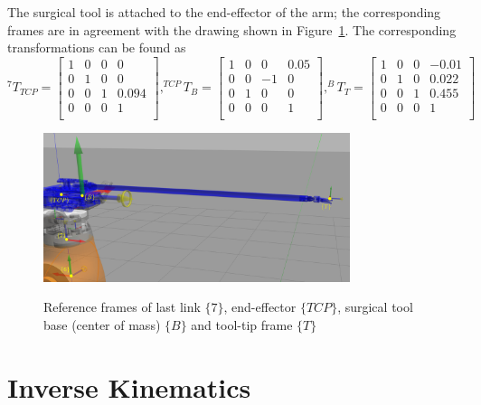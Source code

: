 The surgical tool is attached to the end-effector of the arm; the corresponding frames are in agreement with the drawing shown in Figure~\ref{fig:kuka-surgical tool}. 
The corresponding transformations can be found as
\begin{equation*}
^{7}T_{TCP} = 
\begin{bmatrix}
1 & 0 & 0 & 0 \\
0 & 1 & 0 & 0 \\
0 & 0 & 1 & 0.094 \\
0 & 0 & 0 & 1 \\
\end{bmatrix}
,
^{TCP}T_{B} = 
\begin{bmatrix}
1 & 0 & 0 & 0.05 \\
0 & 0 & -1 & 0 \\
0 & 1 & 0 & 0 \\
0 & 0 & 0 & 1 \\
\end{bmatrix}
,
^{B}T_T = 
\begin{bmatrix}
1 & 0 & 0 & -0.01 \\
0 & 1 & 0 & 0.022 \\
0 & 0 & 1 & 0.455 \\
0 & 0 & 0 & 1 \\
\end{bmatrix}
\end{equation*}

\begin{figure}[htbp]
\centering
\includegraphics[width=0.8\textwidth]{images/eef_tcp_tip_tf.png}\\
\caption{Reference frames of last link $\lbrace 7 \rbrace$, end-effector $\lbrace TCP \rbrace$, surgical tool base (center of mass) $\lbrace B \rbrace$ and tool-tip frame $\lbrace T \rbrace$}
\label{fig:kuka-surgical tool}
\end{figure}

\section{Inverse Kinematics}

